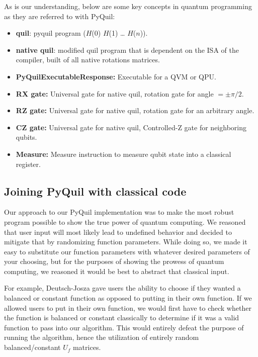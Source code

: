 \documentclass[12pt]{article}
\begin{document}
As is our understanding, below are some key concepts in quantum programming as they are referred to with PyQuil:
\begin{itemize}
    \item \textbf{quil}: pyquil program ($H$(0) $H$(1) … $H$($n$)).
    \item \textbf{native quil}: modified quil program that is dependent on the ISA of the compiler, built of all native rotations matrices.
    \item \textbf{PyQuilExecutableResponse:} Executable for a QVM or QPU.
    \item \textbf{RX gate:} Universal gate for native quil, rotation gate for angle $= \pm\pi/2$.
    \item \textbf{RZ gate:} Universal gate for native quil, rotation gate for an arbitrary angle.
    \item \textbf{CZ gate:} Universal gate for native quil, Controlled-Z gate for neighboring qubits.
    \item \textbf{Measure:} Measure instruction to measure qubit state into a classical register.
\end{itemize}

\subsection{Joining PyQuil with classical code}

Our approach to our PyQuil implementation was to make the most robust program possible to show the true power of quantum computing.
We reasoned that user input will most likely lead to undefined behavior and decided to mitigate that by randomizing function parameters.
While doing so, we made it easy to substitute our function parameters with whatever desired parameters of your choosing, but for the purposes of showing the prowess of quantum computing, we reasoned it would be best to abstract that classical input.

For example, Deutsch-Josza gave users the ability to choose if they wanted a balanced or constant function as opposed to putting in their own function.
If we allowed users to put in their own function, we would first have to check whether the function is balanced or constant classically to determine if it was a valid function to pass into our algorithm.
This would entirely defeat the purpose of running the algorithm, hence the utilization of entirely random balanced/constant $U_f$ matrices.

\nocite{pyquil}
\nocite{Qiskit}
\end{document}
